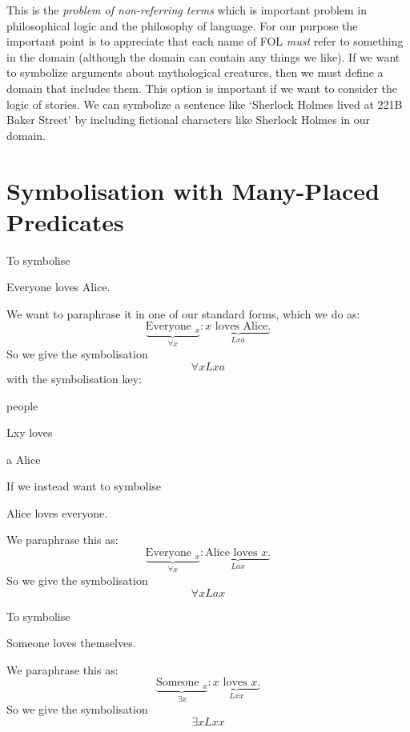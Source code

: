 This is the \emph{problem of non-referring terms} which is important problem in philosophical logic and the philosophy of language. For our purpose the important point is to appreciate that each name of FOL \emph{must} refer to something in the domain (although the domain can contain any things we like). If we want to symbolize arguments about mythological creatures, then we must define a domain that includes them. This option is important if we want to consider the logic of stories. We can symbolize a sentence like `Sherlock Holmes lived at 221B Baker Street' by including fictional characters like Sherlock Holmes in our domain.



\section{Symbolisation with Many-Placed Predicates}



To symbolise
\begin{earg}
	\item[\ex{loveseveryone1}] Everyone loves Alice.
\end{earg}
We want to paraphrase it in one of our standard forms, which we do as:
\begin{equation*}
\underbrace{\text{Everyone $_x$}}_{\forall x}: \underbrace{\text{$x$ loves Alice.}}_{Lxa}
\end{equation*}
So we give the symbolisation $$\forall x Lxa$$ with the symbolisation key:
\begin{ekey}
\item[\text{domain}] people
\item[Lxy] loves 
\item[a] Alice
\end{ekey}
If we instead want to symbolise
\begin{earg}
	\item[\ex{loveseveryone2}] Alice loves everyone.
\end{earg}
We paraphrase this as:
\begin{equation*}
\underbrace{\text{Everyone $_x$}}_{\forall x}: \underbrace{\text{Alice loves $x$.}}_{Lax}
\end{equation*}
So we give the symbolisation $$\forall x Lax$$

To symbolise
\begin{earg}
	\item[\ex{lovesesomeonethemselves}] Someone loves themselves.
\end{earg}
We paraphrase this as:
\begin{equation*}
\underbrace{\text{Someone $_x$}}_{\exists x}: \underbrace{\text{$x$ loves $x$.}}_{Lxx}
\end{equation*}
So we give the symbolisation $$\exists x Lxx$$

